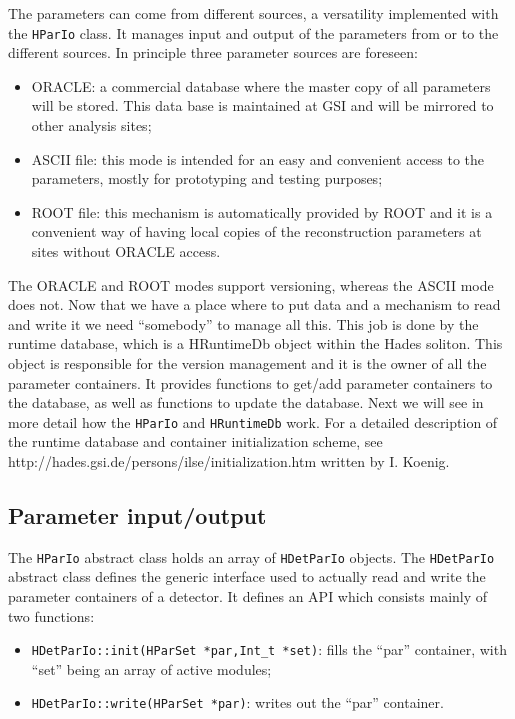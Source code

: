 The parameters can come from different sources, a versatility implemented with the \verb+HParIo+ 
class. It manages input and output of the parameters from or to the different sources. 
In principle three parameter sources are foreseen:
\begin{itemize}
    \item ORACLE: a commercial database where the master copy of all parameters will be 
    stored. This data base is maintained at GSI and will be mirrored to other analysis sites;
    \item ASCII file: this mode is intended for an easy and convenient access to the 
    parameters, mostly for prototyping and testing purposes;
    \item ROOT file: this mechanism is automatically provided by ROOT and it is a 
    convenient way of having local copies of the reconstruction parameters at sites 
    without ORACLE access. 
\end{itemize}

The ORACLE and ROOT modes support versioning, whereas the ASCII mode does not.
Now that we have a place where to put data and a mechanism to read and write it 
we need ``somebody'' to manage all this. This job is done by the runtime database, 
which is a HRuntimeDb object within the Hades soliton. This object is responsible 
for the version management and it is the owner of all the parameter containers. 
It provides functions to get/add parameter containers to the database, as well 
as functions to update the database.
Next we will see in more detail how the \verb+HParIo+ and \verb+HRuntimeDb+ work. 
For a detailed description of the runtime database and container initialization scheme, 
see http://hades.gsi.de/persons/ilse/initialization.htm written by I. Koenig.


\subsection{Parameter input/output} 

The \verb+HParIo+ abstract class holds an array of \verb+HDetParIo+ objects. The 
\verb+HDetParIo+ abstract class defines the generic interface used to actually 
read and write the parameter containers of a detector. It defines an API which 
consists mainly of two functions:
\begin{itemize}
    \item \verb+HDetParIo::init(HParSet *par,Int_t *set)+: fills the ``par'' container, 
    with ``set'' being an array of active modules; 
    \item \verb+HDetParIo::write(HParSet *par)+: writes out the ``par'' container. 
\end{itemize}

